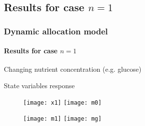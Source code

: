 \documentclass[handout]{beamer}
\begin{document}
\subsection{Results for case $n=1$}
\begin{frame}
\frametitle{Dynamic allocation model}
\framesubtitle{Results for case $n=1$}

\begin{block}{Changing nutrient concentration (e.g. glucose)}
\begin{figure}[h]
	\label{ris:psi}
	\end{figure}
\end{block}

\begin{block}{State variables response}
\begin{figure}
\texttt{[image: x1]}
	\label{ris:x1}
\endminipage\hfill
{}
\texttt{[image: m0]}
	\label{ris:m0}
\endminipage\hfill
\end{figure}
\begin{figure}
\texttt{[image: m1]}
	\label{ris:m1}
\endminipage\hfill
{}
\texttt{[image: mg]}
	\label{ris:mg}
\endminipage\hfill
\end{figure}
\end{block}
\end{frame}
	
\end{document}
